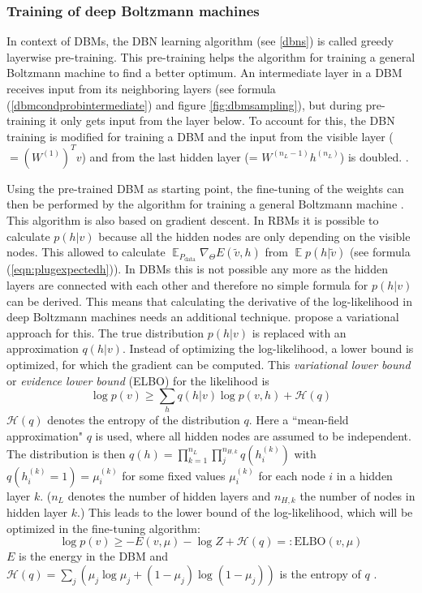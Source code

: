 \documentclass[12pt]{article}
\newcommand{\ELBO}{\mathrm{ELBO}}
\DeclareMathOperator{\EX}{\mathbb{E}}
\begin{document}
\subsubsection{Training of deep Boltzmann machines}\label{dbmtraining}


In context of DBMs, the DBN learning algorithm (see \ref{dbns}) is called greedy layerwise pre-training. 
This pre-training helps the algorithm for training a general Boltzmann machine to find a better optimum.
An intermediate layer in a DBM receives input from its neighboring layers (see formula (\ref{dbmcondprobintermediate}) and figure \ref{fig:dbmsampling}), but during pre-training it only gets input from the layer below. To account for this, the DBN training is modified for training a DBM and the input from the visible layer ($ = (W^{(1)})^T v$) and from the last hidden layer (= $W^{(n_L-1)} h^{(n_L)}$) is doubled.
\citep{salakhutdinov2009DBMs}.


Using the pre-trained DBM as starting point, the fine-tuning of the weights can then be performed by the algorithm for training a general Boltzmann machine
\citep{salakhutdinov2009DBMs, salakhutdinov2015generativemodels}.
This algorithm is also based on gradient descent.
In RBMs it is possible to calculate $p(h | v)$ because all the hidden nodes are only depending on the visible nodes.
This allowed to calculate $\EX_{P_{\text{data}}} \nabla_{\!\Theta} E(\tilde{v},h)$ from $\EX p(h | \tilde{v})$ (see formula (\ref{eqn:plugexpectedh})).
In DBMs this is not possible any more as the hidden layers are connected with each other and therefore no simple formula for $p(h | v)$ can be derived.
This means that calculating the derivative of the log-likelihood in deep Boltzmann machines needs an additional technique.
\cite{salakhutdinov2009DBMs} propose a variational approach for this.
The true distribution $p(h|v)$  is replaced with an approximation $q(h|v)$.
Instead of optimizing the log-likelihood, a lower bound is optimized, for which the gradient can be computed.
This \emph{variational lower bound} or \emph{evidence lower bound} (ELBO) \citep{blei_variational_2017} for the likelihood is
\[
\log p(v) \geq \sum_h q(h|v) \log p(v,h) + \mathcal{H}(q)
\]
$\mathcal{H}(q)$ denotes the entropy of the distribution $q$.
Here a ``mean-field approximation" $q$ is used, where all hidden nodes are assumed to be independent.
The distribution is then $q(h) = \prod_{k=1}^{n_L} \prod_j^{n_{H,k}} q(h_i^{(k)})$ with $q(h_i^{(k)} = 1) = \mu_i^{(k)}$ for some fixed values $\mu_i^{(k)}$ for each  node $i$ in a hidden layer $k$.
($n_L$ denotes the number of hidden layers and $n_{H,k}$ the number of nodes in hidden layer $k$.)
This leads to the lower bound of the log-likelihood, which will be optimized in the fine-tuning algorithm: %
\[
   \log p(v) \geq - E(v, \mu) - \log Z + \mathcal{H}(q) =: \ELBO(v, \mu)
\]
$E$ is the energy in the DBM and $\mathcal{H}(q) = \sum_j \left( \mu_j \log \mu_j + (1- \mu_j) \log ( 1- \mu_j) \right)$ is the entropy of $q$ \citep{sala2012anefficient, salakhutdinov2015generativemodels}.
\end{document}
